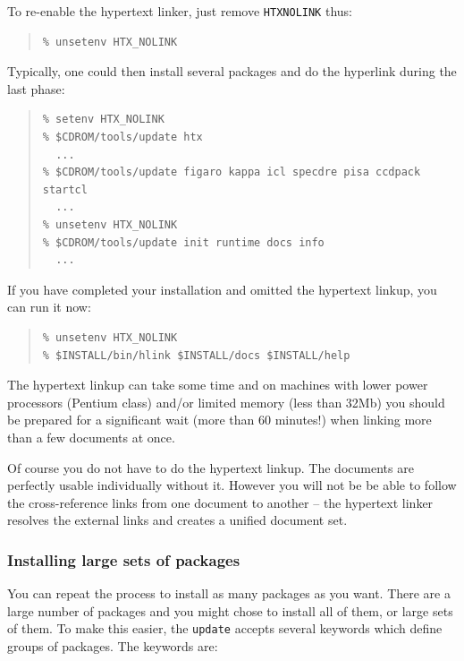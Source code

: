 \documentclass[twoside,11pt]{article}
\renewcommand{\_}{\texttt{\symbol{95}}}
\begin{document}
To re-enable the hypertext linker, just remove \texttt{HTX\_NOLINK} thus:

\begin{quote}
\begin{verbatim}
% unsetenv HTX_NOLINK
\end{verbatim}
\end{quote}

Typically, one could then install several packages and do the hyperlink
during the last phase:

\begin{quote}
\begin{verbatim}
% setenv HTX_NOLINK
% $CDROM/tools/update htx
  ...
% $CDROM/tools/update figaro kappa icl specdre pisa ccdpack startcl
  ...
% unsetenv HTX_NOLINK
% $CDROM/tools/update init runtime docs info
  ...
\end{verbatim}  
\end{quote}

If you have completed your installation and omitted the hypertext
linkup, you can run it now:

\begin{quote}
\begin{verbatim}
% unsetenv HTX_NOLINK
% $INSTALL/bin/hlink $INSTALL/docs $INSTALL/help
\end{verbatim}
\end{quote}

The hypertext linkup can take some time and on machines with lower power
processors (Pentium class) and/or limited memory (less than 32Mb) you
should be prepared for a significant wait (more than 60 minutes!) when
linking more than a few documents at once.

Of course you do not have to do the hypertext linkup.  The documents
are perfectly usable individually without it.  However you will not be
be able to follow the cross-reference links from one document to another
-- the hypertext linker resolves the external links and creates a unified
document set.

\subsubsection{Installing large sets of packages}

You can repeat the process to install as many packages as you want.  There
are a large number of packages and you might chose to install all of them,
or large sets of them.  To make this easier, the \texttt{update} accepts
several keywords which define groups of packages.  The keywords are:
\end{document}
